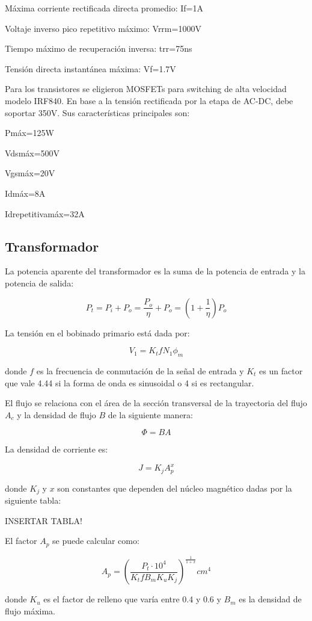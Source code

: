 Máxima corriente rectificada directa promedio: If=1A

Voltaje inverso pico repetitivo máximo: Vrrm=1000V

Tiempo máximo de recuperación inversa: trr=75ns

Tensión directa instantánea máxima: Vf=1.7V

Para los transistores se eligieron MOSFETs para switching de alta velocidad modelo IRF840. 
En base a la tensión rectificada por la etapa de AC-DC, debe soportar 350V.
Sus características principales son: 

Pmáx=125W

Vdsmáx=500V
 
Vgsmáx=20V

Idmáx=8A

Idrepetitivamáx=32A

\subsection{Transformador}

La potencia aparente del transformador es la suma de la potencia de entrada y la potencia de salida:

$$ P_{t}=P_{i}+P_{o}=\frac{P_{o}}{\eta}+P_{o}=(1+\frac{1}{\eta})P_{o} $$

La tensión en el bobinado primario está dada por: 

$$ V_{1}=K_{t} f N_{1} \phi_{m} $$

donde $f$ es la frecuencia de conmutación de la señal de entrada y 
$K_t$ es un factor que vale 4.44 si la forma de onda es sinusoidal o 4 si es rectangular.

El flujo se relaciona con el área de la sección transversal de la trayectoria del flujo $A_{c}$ y la densidad de flujo $B$ de la siguiente manera:

$$ \Phi=BA $$

La densidad de corriente es:

$$ J=K_{j} A_{p}^{x} $$

donde $K_{j}$ y $x$ son constantes que dependen del núcleo magnético dadas por la siguiente tabla:

INSERTAR TABLA!

El factor $A_{p}$ se puede calcular como: 

$$ A_{p}=\left(\frac{P_{t} \cdot 10^{4}}{K_{t} f B_{m} K_{u} K_{j}}\right)^{\frac{1}{1+x}} {cm}^{4} $$

donde $K_u$ es el factor de relleno que varía entre 0.4 y 0.6 y $B_m$ es la densidad de flujo máxima.

